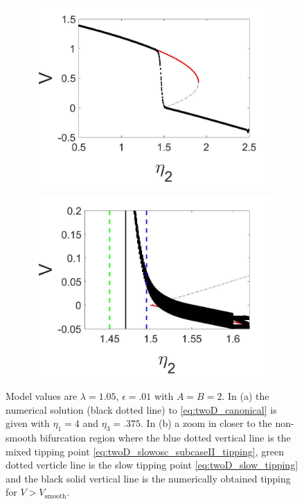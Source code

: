 \begin{figure}[H]
\centering
\begin{subfigure}{.5\textwidth}
  \centering
  \includegraphics[width=\linewidth]{twoD/slowosc_bif_diagram_medium.jpg}
  \caption{}
\end{subfigure}%
\begin{subfigure}{.5\textwidth}
  \centering
  \includegraphics[width=\linewidth]{twoD/slowosc_bif_diagram_medium_zoom.jpg}
  \caption{}
\end{subfigure}
\caption{Model values are $\lambda=1.05$, $\epsilon=.01$ with $A=B=2$. In (a) the numerical solution (black dotted line) to \eqref{eq:twoD_canonical} is given with $\eta_1=4$ and $\eta_3=.375$. In (b) a zoom in closer to the non-smooth bifurcation region where the blue dotted vertical line is the mixed tipping point \eqref{eq:twoD_slowosc_subcaseII_tipping}, green dotted verticle line is the slow tipping point \eqref{eq:twoD_slow_tipping} and the black solid vertical line is the numerically obtained tipping for $V>V_{\text{smooth}}$.}
\label{fig:twoD_slowosc_Vnumerics_medium}
\end{figure}

